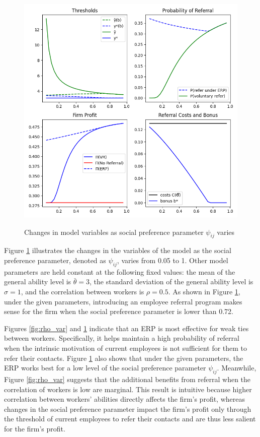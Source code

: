 \documentclass[12pt]{article}
\begin{document}
\begin{figure}[ht]
    \caption{Changes in model variables as social preference parameter $\psi_{ij}$ varies}
    \includegraphics[width=12cm]{images/imperf_psi_var.png}
    \centering
    \label{fig:psi_var}
\end{figure}

Figure \ref{fig:psi_var} illustrates the changes in the  variables of the model as the social preference parameter, denoted as $\psi_{ij}$, varies from 0.05 to 1. Other model parameters are held constant at the following fixed values: the mean of the general ability level is $\bar{\theta} = 3$, the standard deviation of the general ability level is $\sigma = 1$, and the correlation between workers is $\rho = 0.5$. As shown in Figure \ref{fig:psi_var}, under the given parameters, introducing an employee referral program makes sense for the firm when the social preference parameter is lower than 0.72.

Figures \ref{fig:rho_var} and \ref{fig:psi_var} indicate that an ERP is most effective for weak ties between workers. Specifically, it helps maintain a high probability of referral when the intrinsic motivation of current employees is not sufficient for them to refer their contacts. Figure \ref{fig:psi_var} also shows that under the given parameters, the ERP works best for a low level of the social preference parameter $\psi_{ij}$. Meanwhile, Figure \ref{fig:rho_var} suggests that the additional benefits from referral when the correlation of workers is low are marginal. This result is intuitive because higher correlation between workers' abilities directly affects the firm's profit, whereas changes in the social preference parameter impact the firm's profit only through the threshold of current employees to refer their contacts and are thus less salient for the firm's profit.


\pagebreak
\end{document}

